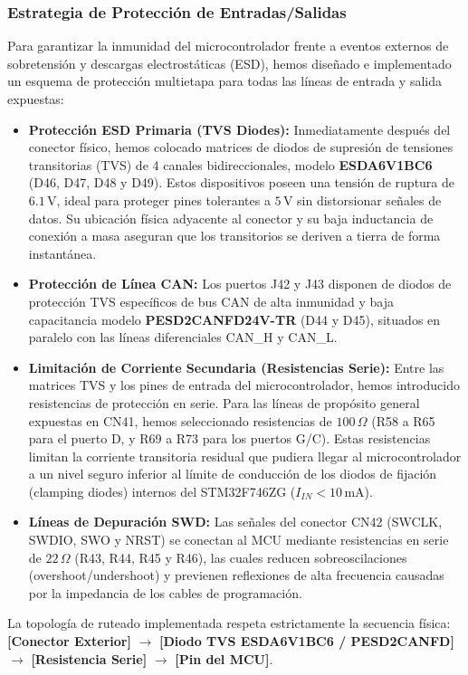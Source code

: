 \documentclass[12pt,a4paper]{article}
\begin{document}
\subsubsection{Estrategia de Protección de Entradas/Salidas}
Para garantizar la inmunidad del microcontrolador frente a eventos externos de sobretensión y descargas electrostáticas (ESD), hemos diseñado e implementado un esquema de protección multietapa para todas las líneas de entrada y salida expuestas:
\begin{itemize}
    \item \textbf{Protección ESD Primaria (TVS Diodes):} Inmediatamente después del conector físico, hemos colocado matrices de diodos de supresión de tensiones transitorias (TVS) de 4 canales bidireccionales, modelo \textbf{ESDA6V1BC6} (D46, D47, D48 y D49). Estos dispositivos poseen una tensión de ruptura de $6.1\,\text{V}$, ideal para proteger pines tolerantes a $5\,\text{V}$ sin distorsionar señales de datos. Su ubicación física adyacente al conector y su baja inductancia de conexión a masa aseguran que los transitorios se deriven a tierra de forma instantánea.
    \item \textbf{Protección de Línea CAN:} Los puertos J42 y J43 disponen de diodos de protección TVS específicos de bus CAN de alta inmunidad y baja capacitancia modelo \textbf{PESD2CANFD24V-TR} (D44 y D45), situados en paralelo con las líneas diferenciales CAN\_H y CAN\_L.
    \item \textbf{Limitación de Corriente Secundaria (Resistencias Serie):} Entre las matrices TVS y los pines de entrada del microcontrolador, hemos introducido resistencias de protección en serie. Para las líneas de propósito general expuestas en CN41, hemos seleccionado resistencias de $100\,\Omega$ (R58 a R65 para el puerto D, y R69 a R73 para los puertos G/C). Estas resistencias limitan la corriente transitoria residual que pudiera llegar al microcontrolador a un nivel seguro inferior al límite de conducción de los diodos de fijación (clamping diodes) internos del STM32F746ZG ($I_{IN} < 10\,\text{mA}$).
    \item \textbf{Líneas de Depuración SWD:} Las señales del conector CN42 (SWCLK, SWDIO, SWO y NRST) se conectan al MCU mediante resistencias en serie de $22\,\Omega$ (R43, R44, R45 y R46), las cuales reducen sobreoscilaciones (overshoot/undershoot) y previenen reflexiones de alta frecuencia causadas por la impedancia de los cables de programación.
\end{itemize}

La topología de ruteado implementada respeta estrictamente la secuencia física: \textbf{[Conector Exterior]} $\rightarrow$ \textbf{[Diodo TVS ESDA6V1BC6 / PESD2CANFD]} $\rightarrow$ \textbf{[Resistencia Serie]} $\rightarrow$ \textbf{[Pin del MCU]}.
\end{document}
